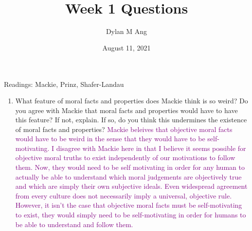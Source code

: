 \documentclass[12pt]{article}
\title{Week 1 Questions}
\author{Dylan M Ang}
\date{August 11, 2021}
\newcommand{\ans}[1]{\textcolor{purple}{#1}}
\begin{document}
\maketitle

Readings: Mackie, Prinz, Shafer-Landau

\begin{enumerate}
    \item What feature of moral facts and properties does Mackie think is so weird? Do you agree with Mackie that moral facts and properties would have to have this feature? If not, explain. If so, do you think this undermines the existence of moral facts and properties?
    \ans{Mackie beleives that objective moral facts would have to be weird in the sense that they would have to be self-motivating. I disagree with Mackie here in that I believe it seems possible for objective moral truths to exist independently of our motivations to follow them. Now, they would need to be self motivating in order for any human to actually be able to understand which moral judgements are objectively true and which are simply their own subjective ideals. Even widespread agreement from every culture does not necessarily imply a universal, objective rule. However, it isn't the case that objective moral facts must be self-motivating to exist, they would simply need to be self-motivating in order for humans to be able to understand and follow them.}


\end{enumerate}
\end{document}
